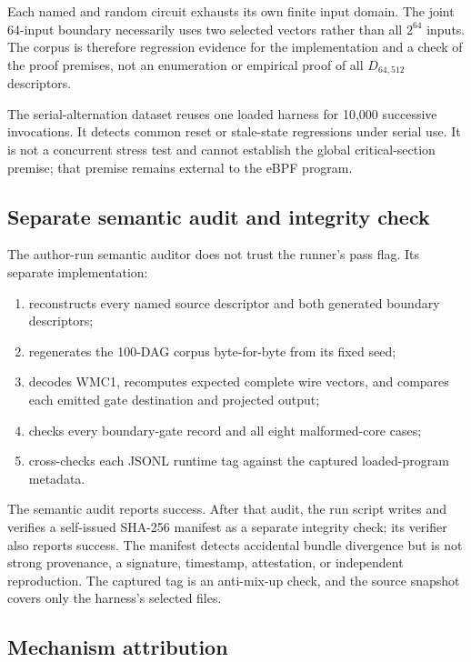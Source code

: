 \documentclass[conference]{IEEEtran}
\begin{document}
Each named and random circuit exhausts its own finite input domain. The joint 64-input boundary necessarily uses two selected vectors rather than all $2^{64}$ inputs. The corpus is therefore regression evidence for the implementation and a check of the proof premises, not an enumeration or empirical proof of all $D_{64,512}$ descriptors.

The serial-alternation dataset reuses one loaded harness for 10,000 successive invocations. It detects common reset or stale-state regressions under serial use. It is not a concurrent stress test and cannot establish the global critical-section premise; that premise remains external to the eBPF program.

\subsection{Separate semantic audit and integrity check}

The author-run semantic auditor does not trust the runner's pass flag. Its separate implementation:

\begin{enumerate}
\item reconstructs every named source descriptor and both generated boundary descriptors;
\item regenerates the 100-DAG corpus byte-for-byte from its fixed seed;
\item decodes WMC1, recomputes expected complete wire vectors, and compares each emitted gate destination and projected output;
\item checks every boundary-gate record and all eight malformed-core cases;
\item cross-checks each JSONL runtime tag against the captured loaded-program metadata.
\end{enumerate}

The semantic audit reports success. After that audit, the run script writes and verifies a self-issued SHA-256 manifest as a separate integrity check; its verifier also reports success. The manifest detects accidental bundle divergence but is not strong provenance, a signature, timestamp, attestation, or independent reproduction. The captured tag is an anti-mix-up check, and the source snapshot covers only the harness's selected files.

\subsection{Mechanism attribution}
\end{document}
